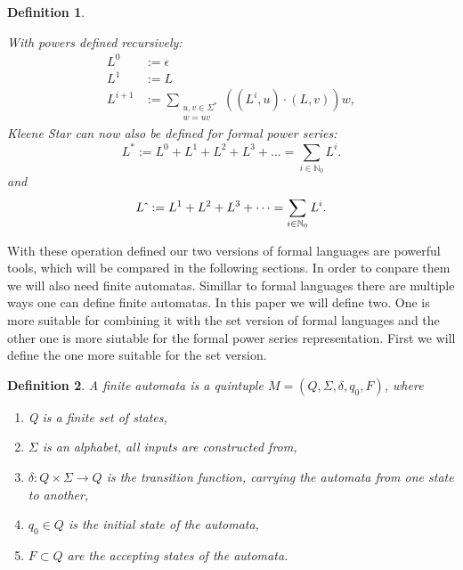 \documentclass[12pt,letterpaper]{article}
\newtheorem{definition}{Definition}
\begin{document}
\begin{definition}
\begin{center}
  \end{center}
  With powers defined recursively:
  \begin{align*}
    L^0 &:= \epsilon\\
    L^1 &:= L\\
    L^{i+1} &:= \sum_{\substack{u,v \in \Sigma^* \\ w = uv}}
    ((L^i,u)\cdot (L,v))w, 
  \end{align*}
  Kleene Star can now also be defined for formal power series:
  \[
    L^* := L^0 + L^1 + L^2 + L^3 + \dots = \sum_{i \in \mathbb{N}_0} L^i.
  \]
  and
  \[
    L\hat{\mkern6mu} :=  L^1 + L^2 + L^3 + \dots = \sum_{i \in \mathbb{N}_0} L^i.
  \]
\end{definition}
With these operation defined our two versions of formal languages are 
powerful tools, which will be compared in the following sections. In order
to conpare them we will also need finite automatas. Simillar to formal languages
there are multiple ways one can define finite automatas. In this paper we
will define two. One is more suitable for combining it with the set version
of formal languages and the other one is more siutable for the formal power
series representation. First we will define the one more suitable for the
set version.
\begin{definition}
  A finite automata is a quintuple $M = (Q, \Sigma, \delta, q_0, F)$, 
  where
  \begin{enumerate}
    \item Q is a finite set of states,
    \item $\Sigma$ is an alphabet, all inputs are constructed from,
    \item $\delta: Q \times \Sigma \to Q$ is the transition function,
      carrying the automata from one state to another,
    \item $q_0 \in Q$ is the initial state of the automata,
    \item $F \subset Q$ are the accepting states of the automata.
  \end{enumerate}
\end{definition}
\end{document}
